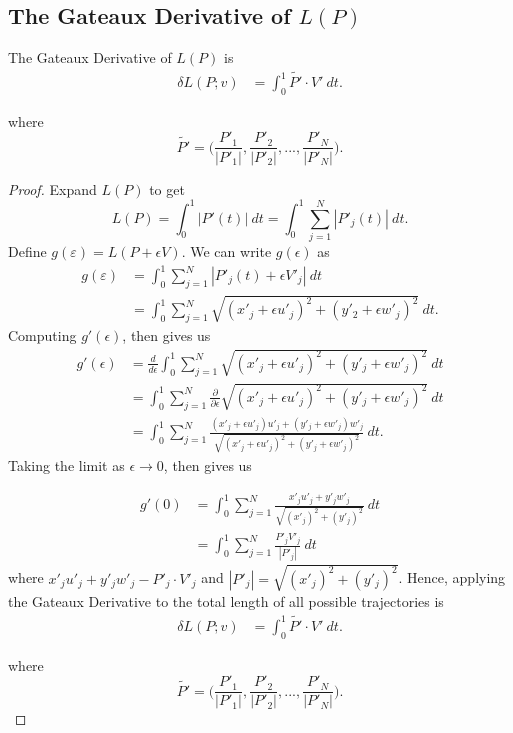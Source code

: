 \subsection{The Gateaux Derivative of \( L(P) \)}
\begin{prop}
   The Gateaux Derivative of \( L(P) \) is 
\begin{align*}
    \delta L(P;v) &= \int_{0}^{1} \tilde{P'} \cdot V' \ dt.
\end{align*}

where \[ \tilde{P'} = \bigg( \frac{P'_1}{|P'_1|},\frac{P'_2}{|P'_2|}, ... , \frac{P'_N}{|P'_N|}  \bigg) .\]
\end{prop}
\begin{proof}
Expand \( L(P)  \) to get 
\[  L(P) = \int_{ 0 }^{ 1 } | P'(t)  |  \ dt = \int_{ 0 }^{ 1 } \sum_{ j=1 }^{ N }| P'_{j}(t) |  \ dt. \]
Define \( g(\varepsilon) = L(P + \epsilon V)  \). We can write \( g(\epsilon ) \) as  
\begin{align*}
    g(\varepsilon) &= \int_{ 0 }^{ 1 } \sum_{ j=1 }^{ N } | P'_{j}(t) + \epsilon V'_{j} |  \ dt \\
                   &= \int_{ 0 }^{ 1 }  \sum_{ j=1 }^{ N } \sqrt{ (x'_{j} + \epsilon u'_{j})^{2} + (y'_{2} + \epsilon w'_{j})^{2}  }  \ dt.
\end{align*}
Computing \( g'(\epsilon ) \), then gives us
\begin{align*}
   g'(\epsilon ) &= \frac{ d }{ d \epsilon  }  \int_{ 0 }^{ 1 } \sum_{ j=1 }^{ N } \sqrt{ (x'_{j } + \epsilon u'_{j})^{2} + (y'_{j} + \epsilon w'_{j})^{2} }  \ dt \\
                 &= \int_{ 0 }^{ 1 } \sum_{ j=1 }^{ N } \frac{\partial  }{\partial \epsilon  } \sqrt{ (x'_{j} + \epsilon  u'_{j})^{2} + (y'_{j} + \epsilon  w'_{j })^{2}  }  \ dt \\
                 &= \int_{ 0 }^{ 1 } \sum_{ j=1 }^{ N } \frac{ (x'_{j} + \epsilon u'_{j} ) u'_{j} + (y'_{j} + \epsilon  w'_{j}) w'_{j}  }{  \sqrt{  (x'_{j} + \epsilon  u'_{j})^{2} + (y'_{j} + \epsilon  w'_{j })^{2}  }   }  \ dt. 
\end{align*}
Taking the limit as \( \epsilon  \to 0  \), then gives us

\begin{align*}
    g'(0) &= \int_{ 0 }^{ 1 } \sum_{ j=1 }^{ N } \frac{ x'_{j} u'_{j} + y'_{j} w'_{j }  }{ \sqrt{ (x'_{j })^{2} + (y'_{j })^{2} }  }  \ dt \\
          &=  \int_{ 0 }^{ 1 }  \sum_{ j=1 }^{ N } \frac{ P'_{j} V'_{j}  }{ | P'_{j }  |  }  \ dt
\end{align*}
where \( x'_{j} u'_{j } + y'_{j } w'_{j } - P'_{j } \cdot V'_{j }  \) and \( | P'_{j } | = \sqrt{ (x'_{j })^{2} + (y'_{j})^{2}  }  \). Hence, applying the Gateaux Derivative to the total length of all possible trajectories is
\begin{align*}
    \delta L(P;v) &= \int_{0}^{1} \tilde{P'} \cdot V' \ dt.
\end{align*}

where \[ \tilde{P'} = \bigg( \frac{P'_1}{|P'_1|},\frac{P'_2}{|P'_2|}, ... , \frac{P'_N}{|P'_N|}  \bigg) .\]
\end{proof}


